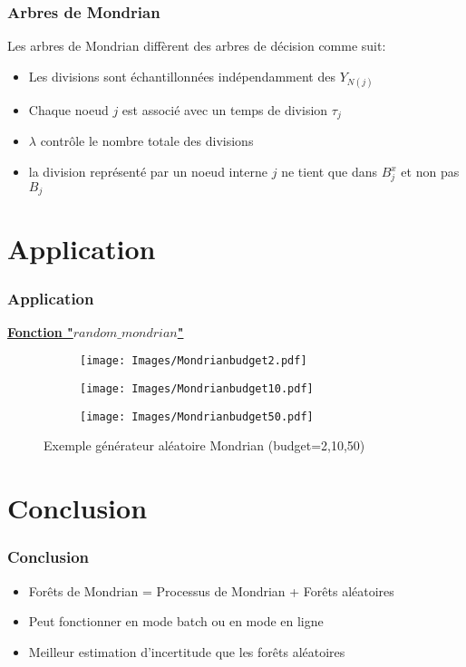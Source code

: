 \documentclass[unknownkeysallowed]{beamer}
\begin{document}
\begin{frame}
\frametitle{Arbres de Mondrian}
Les arbres de Mondrian diffèrent des arbres de décision comme suit:

\begin{itemize}
    \item Les divisions sont échantillonnées indépendamment des $Y_{N(j)}$
    \item Chaque noeud $j$ est associé avec un temps de division $\tau_{j}$
    \item $\lambda$ contrôle le nombre totale des divisions
    \item la division représenté par un noeud interne $j$ ne tient que dans $B_{j}^{x}$ et non pas $B_{j}$
\end{itemize}
\end{frame}

\section{Application}
\begin{frame}[fragile]
\frametitle{Application}
\underline{\textbf{Fonction "$random\_mondrian$"}}

\begin{figure}[H]
  \centering
  \begin{subfigure}{.3\linewidth}
    \centering
    \texttt{[image: Images/Mondrianbudget2.pdf]}
  \end{subfigure}%
  \hspace{1em}%
  \begin{subfigure}{.3\linewidth}
    \centering
    \texttt{[image: Images/Mondrianbudget10.pdf]}
  \end{subfigure}%
  \hspace{2em}%
  \begin{subfigure}{.3\linewidth}
    \centering
    \texttt{[image: Images/Mondrianbudget50.pdf]}
  \end{subfigure}
  \caption{Exemple générateur aléatoire Mondrian (budget=2,10,50)}
\end{figure}
\end{frame}

\section{Conclusion}
\begin{frame}
\frametitle{Conclusion}
\begin{itemize}
    \item Forêts de Mondrian = Processus de Mondrian + Forêts aléatoires
    \item Peut fonctionner en mode batch ou en mode en ligne
    \item Meilleur estimation d'incertitude que les forêts aléatoires
\end{itemize}
\end{frame}
\end{document}
